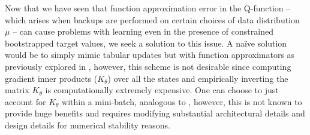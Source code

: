 Now that we have seen that function approximation error in the Q-function -- which arises when backups are performed on certain choices of data distribution $\mu$ -- can cause problems with learning even in the presence of constrained bootstrapped target values, we seek a solution to this issue. A na\"ive solution would be to simply mimic tabular updates but with function approximators as previously explored in \citet{achiam2019towards}, however, this scheme is not desirable since computing gradient inner products ($K_\theta$) over all the states and empirically inverting the matrix $K_\theta$ is computationally extremely expensive. One can choose to just account for $K_\theta$ within a mini-batch, analogous to \citet{achiam2019towards}, however, this is not known to provide huge benefits and requires modifying substantial architectural details and design details for numerical stability reasons.


